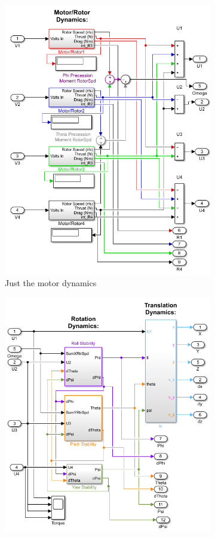 \documentclass[conf]{new-aiaa}
\begin{document}
\begin{doublespace}
\begin{figure}[!h]
\begin{subfigure}{.33\textwidth}
  \includegraphics[scale= 0.35]{motdyn.png}
  \caption{Just the motor dynamics}
  \label{motdyn}
\end{subfigure}
\begin{subfigure}{.33\textwidth}
  \centering
  \includegraphics[scale= 0.35]{sysdyn.png}

\end{subfigure}
\end{figure}
\end{doublespace}
\end{document}
